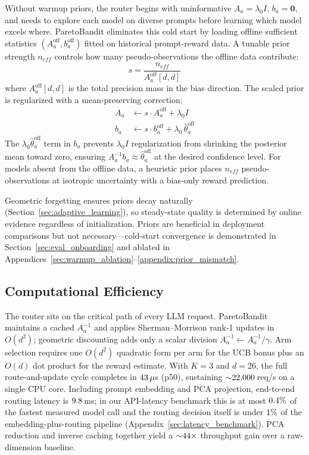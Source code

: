 Without warmup priors, the router begins with uninformative $A_a = \lambda_0 I$, $b_a = \mathbf{0}$, and needs to explore each model on diverse prompts before learning which model excels where. ParetoBandit eliminates this cold start by loading offline sufficient statistics $(A_a^{\mathrm{off}}, b_a^{\mathrm{off}})$ fitted on historical prompt-reward data. A tunable prior strength $n_\mathit{eff}$ controls how many pseudo-observations the offline data contribute:
\begin{equation}
    s = \frac{n_\mathit{eff}}{A_a^{\mathrm{off}}[d, d]}
    \label{eq:prior_scale}
\end{equation}
where $A_a^{\mathrm{off}}[d, d]$ is the total precision mass in the bias direction. The scaled prior is regularized with a mean-preserving correction:
\begin{align}
    A_a &\leftarrow s \cdot A_a^{\mathrm{off}} + \lambda_0 I
    \label{eq:prior_A} \\
    b_a &\leftarrow s \cdot b_a^{\mathrm{off}} + \lambda_0\, \hat\theta_a^{\mathrm{off}}
    \label{eq:prior_b}
\end{align}
The $\lambda_0 \hat\theta_a^{\mathrm{off}}$ term in $b_a$ prevents $\lambda_0 I$ regularization from shrinking the posterior mean toward zero, ensuring $A_a^{-1} b_a \approx \hat\theta_a^{\mathrm{off}}$ at the desired confidence level. For models absent from the offline data, a heuristic prior places $n_\mathit{eff}$ pseudo-observations at isotropic uncertainty with a bias-only reward prediction.

Geometric forgetting ensures priors decay naturally (Section~\ref{sec:adaptive_learning}), so steady-state quality is determined by online evidence regardless of initialization. Priors are beneficial in deployment comparisons but not necessary---cold-start convergence is demonstrated in Section~\ref{sec:eval_onboarding} and ablated in Appendices~\ref{sec:warmup_ablation}--\ref{appendix:prior_mismatch}.

\subsection{Computational Efficiency}
\label{sec:efficiency}

The router sits on the critical path of every LLM request. ParetoBandit maintains a cached $A_a^{-1}$ and applies Sherman--Morrison rank-1 updates in $O(d^2)$; geometric discounting adds only a scalar division $A_a^{-1} \leftarrow A_a^{-1}/\gamma$. Arm selection requires one $O(d^2)$ quadratic form per arm for the UCB bonus plus an $O(d)$ dot product for the reward estimate. With $K{=}3$ and $d{=}26$, the full route-and-update cycle completes in $43\,\mu$s (p50), sustaining ${\sim}22{,}000$\,req/s on a single CPU core. Including prompt embedding and PCA projection, end-to-end routing latency is $9.8$\,ms; in our API-latency benchmark this is at most $0.4\%$ of the fastest measured model call and the routing decision itself is under $1\%$ of the embedding-plus-routing pipeline (Appendix~\ref{sec:latency_benchmark}). PCA reduction and inverse caching together yield a ${\sim}44{\times}$ throughput gain over a raw-dimension baseline.

